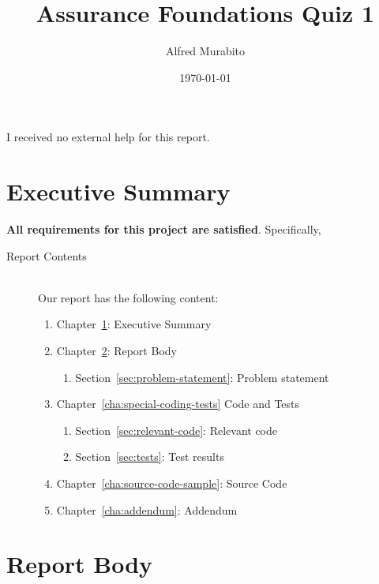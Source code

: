 \documentclass{report}
\title{Assurance Foundations Quiz 1}
\author{Alfred Murabito}
\date{\today}
\begin{document}
\lstset{language=ML}


\maketitle{}


\tableofcontents{}

\begin{acknowledgments}
 I received no external help for this report.
\end{acknowledgments}

\chapter{Executive Summary}
\label{cha:executive-summary}

\textbf{All requirements for this project are satisfied}.
Specifically,
\begin{description}
\item[Report Contents] \ \\
  Our report has the following content:
  \begin{enumerate}[{}]
  \item Chapter~\ref{cha:executive-summary}: Executive Summary
  \item Chapter~\ref{cha:report-body}: Report Body
    \begin{enumerate}[{}]
    \item Section~\ref{sec:problem-statement}: Problem statement
    \end{enumerate}
  \item Chapter~\ref{cha:special-coding-tests} Code and Tests
    \begin{enumerate}[{}]
    \item Section~\ref{sec:relevant-code}: Relevant code
    \item Section~\ref{sec:tests}: Test results
    \end{enumerate}
  \item Chapter~\ref{cha:source-code-sample}: Source Code
  \item Chapter~\ref{cha:addendum}: Addendum
  \end{enumerate}
\end{description}


\chapter{Report Body}
\label{cha:report-body}
\end{document}
